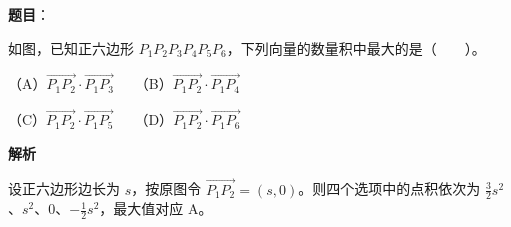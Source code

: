 \begin{answer}

\textbf{题目}：

如图，已知正六边形 $P_1P_2P_3P_4P_5P_6$，下列向量的数量积中最大的是\mbox{（　　）}。
\nopagebreak[4]
\begin{center}\end{center}
\nopagebreak[4]
（A）$\overrightarrow{P_1P_2}\cdot\overrightarrow{P_1P_3}$　　（B）$\overrightarrow{P_1P_2}\cdot\overrightarrow{P_1P_4}$

（C）$\overrightarrow{P_1P_2}\cdot\overrightarrow{P_1P_5}$　　（D）$\overrightarrow{P_1P_2}\cdot\overrightarrow{P_1P_6}$

\textbf{解析}

设正六边形边长为 $s$，按原图令 $\overrightarrow{P_1P_2}=(s,0)$。则四个选项中的点积依次为 $\frac32s^2$、$s^2$、$0$、$-\frac12s^2$，最大值对应 A。


\end{answer}
